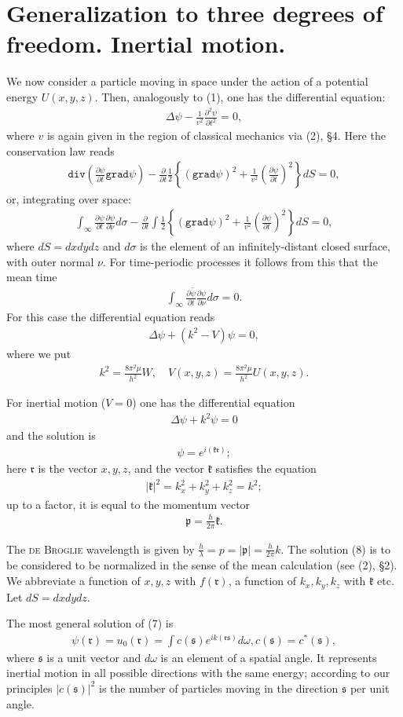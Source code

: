 \documentclass[a4paper,11pt]{article}
\newcommand{\?}[2]{#1\footnote{\textsc{Translator note}: #2}}
\newcommand{\nequ}[2]{\begin{align*}\tag{#1}#2\end{align*}}
\renewcommand{\operatorfont}[1]{\texttt{#1}}
\newcommand{\grad}{\operatorfont{grad}}
\renewcommand{\div}{\operatorfont{div}}
\renewcommand{\exp}[1]{e^{#1}}
\newcommand{\pXpY}[2]{\frac{\partial #1}{\partial #2}}
\newcommand{\ppXpYY}[2]{\frac{\partial^2 #1}{\partial {#2}^2}}
\begin{document}
\section{Generalization to three degrees of freedom. Inertial motion.} We now consider a particle moving in space under the action of a potential energy $U(x, y, z)$. Then, analogously to (1), one has the differential equation:
\nequ{1}{
	\Delta\psi - \frac{1}{v^2}\ppXpYY{\psi}{t} = 0,
}
where $v$ is again given in the region of classical mechanics via (2), \S4. Here the conservation law reads
\nequ{2}{
\div\left(\pXpY{\psi}{t}\grad\psi\right) - \pXpY{}{t}\frac{1}{2}\left\{(\grad\psi)^2 + \frac{1}{v^2}\left(\pXpY{\psi}{t}\right)^2 \right\}dS = 0,
}
or, integrating over space:
\nequ{3}{
\int_\infty \pXpY{\psi}{t}\pXpY{\psi}{\nu}d\sigma - 
\pXpY{}{t}\int \frac{1}{2}
\left\{(\grad\psi)^2 + \frac{1}{v^2}\left(\pXpY{\psi}{t}\right)^2 \right\}dS = 0,
}
where $dS = {dx}{dy}{dz}$ and $d\sigma$ is the element of an infinitely-distant closed surface, with outer normal $\nu$. For time-periodic processes it follows from this that the mean time
\nequ{4}{
\overline{\int_\infty\pXpY{\psi}{t}\pXpY{\psi}{\nu}d\sigma} = 0.
}
For this case the differential equation reads
\nequ{5}{
\Delta\psi + \left(k^2 - V\right)\psi = 0,
}
where we put
\nequ{6}{
k^2 = \frac{8\pi^2\mu}{h^2}W,\quad V(x,y,z) = \frac{8\pi^2\mu}{h^2}U(x,y,z).
}

For inertial motion ($V=0$) one has the differential equation
\nequ{7}{
\Delta\psi + k^2\psi = 0
}
and the solution is
\nequ{8}{
\psi = \exp{i\left(\mathfrak{k}\mathfrak{r}\right)};
}
here $\mathfrak{r}$ is the vector $x, y, z$, and the vector $\mathfrak{k}$ satisfies the equation
\nequ{9}{
\left|\mathfrak{k}\right|^2 = k_x^2 + k_y^2 + k_z^2 = k^2;
}
up to a factor, it is equal to the momentum vector
\nequ{10}{
\mathfrak{p} = \frac{h}{2\pi}\mathfrak{k}.
}

The \textsc{de Broglie} wavelength is given by $\frac{h}{\lambda} = p = |\mathfrak{p}| = \frac{h}{2\pi}k$. The solution (8) is to be considered to be normalized in the sense of the mean calculation (see (2), \S2). We abbreviate a function of $x,y,z$ with $f(\mathfrak{r})$, a function of $k_x,k_y,k_z$ with $\mathfrak{k}$ etc. Let $dS = {dx}{dy}{dz}$.

The most general solution of (7) is
\nequ{11}{
\psi(\mathfrak{r}) = u_0(\mathfrak{r}) = \int c(\mathfrak{s})\exp{ik(\mathfrak{rs})}d\omega, c(\mathfrak{s}) = c^*(\mathfrak{s}),
}
where $\mathfrak{s}$ is a unit vector and $d\omega$ is an element of a spatial angle. It represents inertial motion in all possible directions with the same energy; according to our principles $\left|c(\mathfrak{s})\right|^2$ is the number of particles moving in the direction $\mathfrak{s}$ per unit angle.
\end{document}
